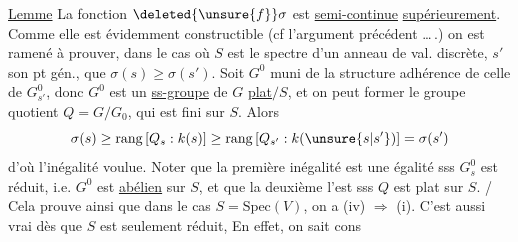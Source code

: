 \uline{Lemme}  La fonction $\deleted{\unsure{f}}\sigma$ est \uline{semi-continue} \uline{supérieurement}.
Comme elle est évidemment constructible (cf l'argument
précédent \ldots\,.) on est ramené à prouver, dans le cas où $S$ est
le spectre d'un anneau de val. discrète, $s'$ son pt gén.,
que $\sigma(s)\geq\sigma(s')$. Soit $G^0$ muni de la structure adhérence
de celle de $G^0_{s'}$, donc $G^0$ est un \uline{ss-groupe} de $G$ \uline{plat}$/S$,
et on peut former le groupe quotient $Q=G/G_0$, qui est
fini sur $S$. Alors
\[
\sigma(s)\geq\mathrm{rang}\,[Q_s:k(s)]\geq\mathrm{rang}\,[Q_{s'}:k(\unsure{s|s'})]=\sigma(s')
\]
d'où l'inégalité voulue. Noter que la première inégalité est
une égalité sss $G_s^0$ est réduit, i.e. $G^0$ est \uline{abélien} sur $S$, et
que la deuxième l'est sss $Q$ est plat sur $S$. / Cela prouve ainsi
que dans le cas $S=\mathrm{Spec}(V)$, on a (iv) $\Longrightarrow$ (i). C'est aussi
vrai dès que $S$ est seulement réduit, En effet, on sait cons%
